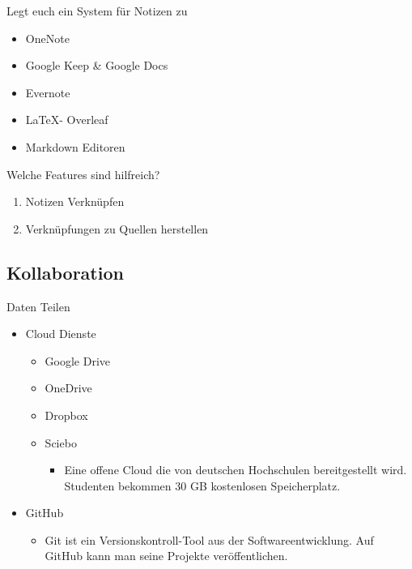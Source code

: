 \documentclass[aspectratio=169,shownotes]{beamer}
\begin{document}
\begin{frame}{Legt euch ein System für Notizen zu}
    \begin{block}
           
    \end{block}    
    \begin{itemize}
        \item OneNote
        \item Google Keep \& Google Docs
        \item Evernote
        \item \LaTeX - Overleaf
        \item Markdown Editoren    
    \end{itemize}
\end{frame}
\begin{frame}{Welche Features sind hilfreich?}
    \begin{enumerate}
        \item Notizen Verknüpfen
        \item Verknüpfungen zu Quellen herstellen
        
    \end{enumerate}
    
\end{frame}

\subsection{Kollaboration}

\begin{frame}{Daten Teilen}
    \begin{itemize}
        \item Cloud Dienste
            \begin{itemize}
                \item Google Drive
                \item OneDrive
                \item Dropbox
                \item Sciebo
                \begin{itemize}
                    \item Eine offene Cloud die von deutschen Hochschulen bereitgestellt wird. Studenten bekommen 30 GB kostenlosen Speicherplatz.
                \end{itemize}
            \end{itemize}
        \item GitHub 
        \begin{itemize}
            \item Git ist ein Versionskontroll-Tool aus der Softwareentwicklung. Auf GitHub kann man seine Projekte veröffentlichen.
        \end{itemize}
    \end{itemize}    
\end{frame}
\end{document}
